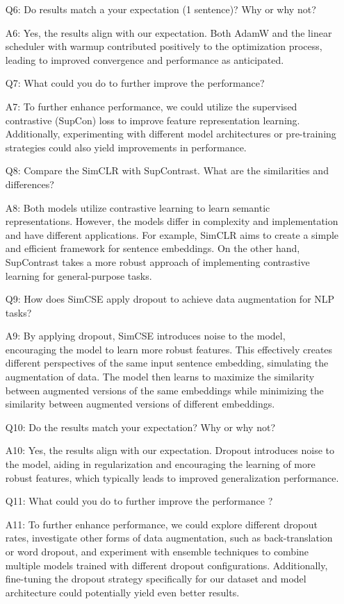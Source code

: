 \begin{enumerate}
  \item [Q6:] Do results match a your expectation (1 sentence)? Why or why not?
  \item [A6:]  Yes, the results align with our expectation. Both AdamW and the linear scheduler with warmup contributed positively to the optimization process, leading to improved convergence and performance as anticipated.
  \item [Q7:] What could you do to further improve the performance?
  \item [A7:]  To further enhance performance, we could utilize the supervised contrastive (SupCon) loss to improve feature representation learning. Additionally, experimenting with different model architectures or pre-training strategies could also yield improvements in performance.
  \item [Q8:] Compare the SimCLR with SupContrast. What are the similarities and differences?
  \item [A8:] Both models utilize contrastive learning to learn semantic representations. However, the models differ in complexity and implementation and have  different applications. For example, SimCLR aims to create a simple and efficient framework for sentence embeddings. On the other hand, SupContrast takes a more robust approach of implementing contrastive learning for general-purpose tasks.
  \item [Q9:] How does SimCSE apply dropout to achieve data augmentation for NLP tasks?
  \item [A9:] By applying dropout, SimCSE introduces noise to the model, encouraging the model to learn more robust features. This effectively creates different perspectives of the same input sentence embedding, simulating the augmentation of data. The model then learns to maximize the similarity between augmented versions of the same embeddings while minimizing the similarity between augmented versions of different embeddings.
  \item [Q10:] Do the results match your expectation? Why or why not?
  \item [A10:] Yes, the results align with our expectation. Dropout introduces noise to the model, aiding in regularization and encouraging the learning of more robust features, which typically leads to improved generalization performance.
  \item [Q11:] What could you do to further improve the performance ?
  \item [A11:] To further enhance performance, we could explore different dropout rates, investigate other forms of data augmentation, such as back-translation or word dropout, and experiment with ensemble techniques to combine multiple models trained with different dropout configurations. Additionally, fine-tuning the dropout strategy specifically for our dataset and model architecture could potentially yield even better results.
\end{enumerate}
